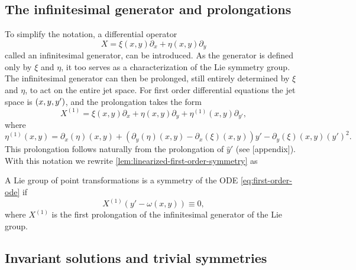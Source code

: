 \subsection{The infinitesimal generator and prolongations}

To simplify the notation, a differential operator
\begin{equation}
  X = \xi(x,y) \partial_x + \eta(x,y) \partial_y
\end{equation}
called an infinitesimal generator, can be introduced.
As the generator is defined only by \(\xi\) and \(\eta\), it too serves as a characterization of the Lie symmetry group.
The infinitesimal generator can then be prolonged, still entirely determined by \(\xi\) and \(\eta\), to act on the entire jet space.
For first order differential equations the jet space is \(\pqty{x, y, y'}\), and the prolongation takes the form
\begin{equation}
  X^{(1)} = \xi(x,y) \partial_x + \eta(x,y) \partial_y + \eta^{(1)}(x,y) \partial_{y'},
\end{equation}
where
\begin{equation}
  \eta^{(1)}(x,y) =
  \partial_x(\eta)(x,y) + (\partial_y(\eta)(x,y) - \partial_x(\xi)(x,y)) y' - \partial_y(\xi)(x,y) \left(y'\right)^2.
\end{equation}
This prolongation follows naturally from the prolongation of \(\hat{y}'\) (see [appendix]). %
With this notation we rewrite \cref{lem:linearized-first-order-symmetry} as
\begin{thm} \label{thm:linearized-first-order-symmetry}
  A Lie group of point transformations is a symmetry of the ODE \ref{eq:first-order-ode} if
  \begin{equation} \label{eq:linearized-first-order-symmetry}
    X^{(1)}\left(y' - \omega(x,y)\right) \equiv 0,
  \end{equation}
  where \(X^{(1)}\) is the first prolongation of the infinitesimal generator of the Lie group.
\end{thm} %


\subsection{Invariant solutions and trivial symmetries}

